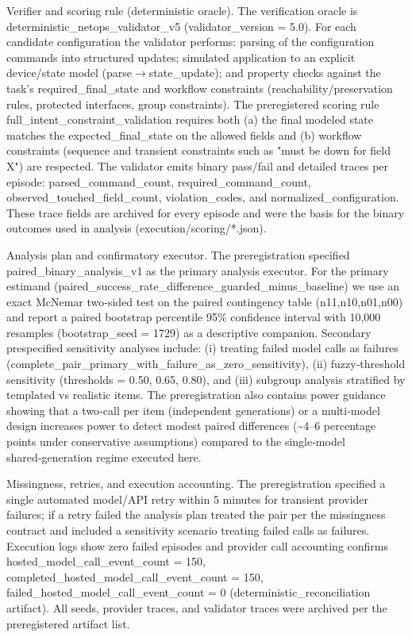 \documentclass[conference]{IEEEtran}
\begin{document}
Verifier and scoring rule (deterministic oracle). The verification oracle is deterministic\_netops\_validator\_v5 (validator\_version = 5.0). For each candidate configuration the validator performs: parsing of the configuration commands into structured updates; simulated application to an explicit device/state model (parse\ensuremath{\rightarrow}state\_update); and property checks against the task's required\_final\_state and workflow constraints (reachability/preservation rules, protected interfaces, group constraints). The preregistered scoring rule full\_intent\_constraint\_validation requires both (a) the final modeled state matches the expected\_final\_state on the allowed fields and (b) workflow constraints (sequence and transient constraints such as "must be down for field X") are respected. The validator emits binary pass/fail and detailed traces per episode: parsed\_command\_count, required\_command\_count, observed\_touched\_field\_count, violation\_codes, and normalized\_configuration. These trace fields are archived for every episode and were the basis for the binary outcomes used in analysis (execution/scoring/*.json).

Analysis plan and confirmatory executor. The preregistration specified paired\_binary\_analysis\_v1 as the primary analysis executor. For the primary estimand (paired\_success\_rate\_difference\_guarded\_minus\_baseline) we use an exact McNemar two‑sided test on the paired contingency table (n11,n10,n01,n00) and report a paired bootstrap percentile 95\% confidence interval with 10,000 resamples (bootstrap\_seed = 1729) as a descriptive companion. Secondary prespecified sensitivity analyses include: (i) treating failed model calls as failures (complete\_pair\_primary\_with\_failure\_as\_zero\_sensitivity), (ii) fuzzy‑threshold sensitivity (thresholds = 0.50, 0.65, 0.80), and (iii) subgroup analysis stratified by templated vs realistic items. The preregistration also contains power guidance showing that a two‑call per item (independent generations) or a multi‑model design increases power to detect modest paired differences (\textasciitilde{}4--6 percentage points under conservative assumptions) compared to the single‑model shared‑generation regime executed here.

Missingness, retries, and execution accounting. The preregistration specified a single automated model/API retry within 5 minutes for transient provider failures; if a retry failed the analysis plan treated the pair per the missingness contract and included a sensitivity scenario treating failed calls as failures. Execution logs show zero failed episodes and provider call accounting confirms hosted\_model\_call\_event\_count = 150, completed\_hosted\_model\_call\_event\_count = 150, failed\_hosted\_model\_call\_event\_count = 0 (deterministic\_reconciliation artifact). All seeds, provider traces, and validator traces were archived per the preregistered artifact list.
\end{document}
